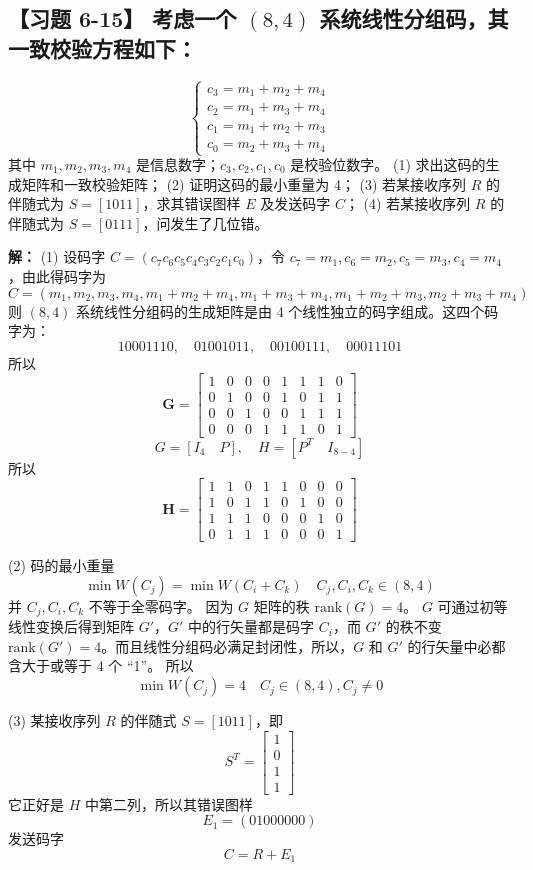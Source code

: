 \documentclass[11pt, a4paper]{article}
\begin{document}
\subsection*{【习题 6-15】 考虑一个 $(8, 4)$ 系统线性分组码，其一致校验方程如下：}
\[
\begin{cases}
c_3 = m_1 + m_2 + m_4 \\
c_2 = m_1 + m_3 + m_4 \\
c_1 = m_1 + m_2 + m_3 \\
c_0 = m_2 + m_3 + m_4
\end{cases}
\]
其中 $m_1, m_2, m_3, m_4$ 是信息数字；$c_3, c_2, c_1, c_0$ 是校验位数字。
(1) 求出这码的生成矩阵和一致校验矩阵；
(2) 证明这码的最小重量为 4；
(3) 若某接收序列 $R$ 的伴随式为 $S=[1011]$，求其错误图样 $E$ 及发送码字 $C$；
(4) 若某接收序列 $R$ 的伴随式为 $S=[0111]$，问发生了几位错。

\textbf{解：}
(1) 设码字 $C = (c_7 c_6 c_5 c_4 c_3 c_2 c_1 c_0)$，令 $c_7=m_1, c_6=m_2, c_5=m_3, c_4=m_4$，由此得码字为
\[ C = (m_1, m_2, m_3, m_4, m_1+m_2+m_4, m_1+m_3+m_4, m_1+m_2+m_3, m_2+m_3+m_4) \]
则 $(8, 4)$ 系统线性分组码的生成矩阵是由 4 个线性独立的码字组成。这四个码字为：
\[ 10001110, \quad 01001011, \quad 00100111, \quad 00011101 \]
所以
\[
\mathbf{G} = \begin{bmatrix}
1 & 0 & 0 & 0 & 1 & 1 & 1 & 0 \\
0 & 1 & 0 & 0 & 1 & 0 & 1 & 1 \\
0 & 0 & 1 & 0 & 0 & 1 & 1 & 1 \\
0 & 0 & 0 & 1 & 1 & 1 & 0 & 1
\end{bmatrix}
\]
\[ G = [I_4 \quad P], \quad H = [P^T \quad I_{8-4}] \]
所以
\[
\mathbf{H} = \begin{bmatrix}
1 & 1 & 0 & 1 & 1 & 0 & 0 & 0 \\
1 & 0 & 1 & 1 & 0 & 1 & 0 & 0 \\
1 & 1 & 1 & 0 & 0 & 0 & 1 & 0 \\
0 & 1 & 1 & 1 & 0 & 0 & 0 & 1
\end{bmatrix}
\]

(2) 码的最小重量
\[ \min W(C_j) = \min W(C_i + C_k) \quad C_j, C_i, C_k \in (8, 4) \]
并 $C_j, C_i, C_k$ 不等于全零码字。
因为 $G$ 矩阵的秩 $\text{rank}(G) = 4$。
$G$ 可通过初等线性变换后得到矩阵 $G'$，$G'$ 中的行矢量都是码字 $C_i$，而 $G'$ 的秩不变 $\text{rank}(G')=4$。而且线性分组码必满足封闭性，所以，$G$ 和 $G'$ 的行矢量中必都含大于或等于 4 个 “1”。
所以
\[ \min W(C_j) = 4 \quad C_j \in (8, 4), C_j \neq 0 \]

(3) 某接收序列 $R$ 的伴随式 $S=[1011]$，即
\[ S^T = \begin{bmatrix} 1 \\ 0 \\ 1 \\ 1 \end{bmatrix} \]
它正好是 $H$ 中第二列，所以其错误图样
\[ E_1 = (01000000) \]
发送码字
\[ C = R + E_1 \]
\end{document}
